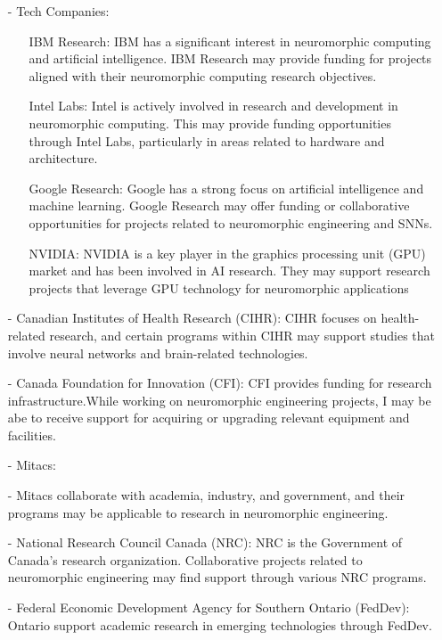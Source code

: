 \begin {itemize}
\begin{itemize}
\begin {itemize}
    NSERC is a federal agency that provides funding for research in natural sciences and engineering. Their Discovery Grants program may support 
    projects related to neuromorphic engineering.
    \item [-] Tech Companies:
    \begin {itemize}
    \item []   IBM Research:
         IBM has a significant interest in neuromorphic computing and artificial intelligence. IBM Research may provide funding for projects aligned with their neuromorphic computing research objectives.
    \item [] Intel Labs:
        Intel is actively involved in research and development in neuromorphic computing. This may provide funding opportunities through Intel Labs, particularly in areas related to hardware and architecture.
    \item []   Google Research:
        Google has a strong focus on artificial intelligence and machine learning. Google Research may offer funding or collaborative opportunities for projects related to neuromorphic engineering and SNNs.
    \item [] NVIDIA:
        NVIDIA is a key player in the graphics processing unit (GPU) market and has been involved in AI research. They may support research projects that leverage GPU technology for neuromorphic applications
\end {itemize}
 \item [-] Canadian Institutes of Health Research (CIHR):
    CIHR focuses on health-related research, and certain programs within CIHR may support studies that involve neural networks and brain-related technologies.
\item [-]     Canada Foundation for Innovation (CFI):
    CFI provides funding for research infrastructure.While working on neuromorphic engineering projects, I may be abe to receive support for acquiring or upgrading relevant equipment and facilities.
 \item [-] Mitacs:
   \item [-]  Mitacs  collaborate with academia, industry, and government, and their programs may be applicable to research in neuromorphic engineering.
  \item [-]   National Research Council Canada (NRC):
    NRC is the Government of Canada's research organization. Collaborative projects related to neuromorphic engineering may find support through various NRC programs.
    \item [-]
    Federal Economic Development Agency for Southern Ontario (FedDev):
        Ontario support academic research in emerging technologies through FedDev.
         \end {itemize}
   \end{itemize}







\end{itemize}
